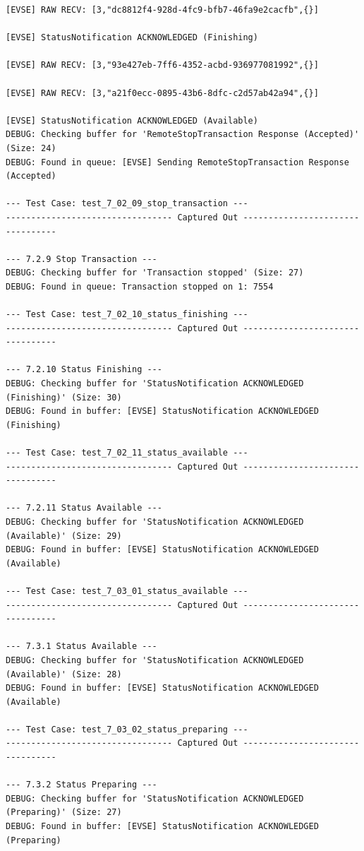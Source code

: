 \documentclass{article}
\begin{document}
\begin{lstlisting}
[EVSE] RAW RECV: [3,"dc8812f4-928d-4fc9-bfb7-46fa9e2cacfb",{}]

[EVSE] StatusNotification ACKNOWLEDGED (Finishing)

[EVSE] RAW RECV: [3,"93e427eb-7ff6-4352-acbd-936977081992",{}]

[EVSE] RAW RECV: [3,"a21f0ecc-0895-43b6-8dfc-c2d57ab42a94",{}]

[EVSE] StatusNotification ACKNOWLEDGED (Available)
DEBUG: Checking buffer for 'RemoteStopTransaction Response (Accepted)' (Size: 24)
DEBUG: Found in queue: [EVSE] Sending RemoteStopTransaction Response (Accepted)

--- Test Case: test_7_02_09_stop_transaction ---
--------------------------------- Captured Out ---------------------------------

--- 7.2.9 Stop Transaction ---
DEBUG: Checking buffer for 'Transaction stopped' (Size: 27)
DEBUG: Found in queue: Transaction stopped on 1: 7554

--- Test Case: test_7_02_10_status_finishing ---
--------------------------------- Captured Out ---------------------------------

--- 7.2.10 Status Finishing ---
DEBUG: Checking buffer for 'StatusNotification ACKNOWLEDGED (Finishing)' (Size: 30)
DEBUG: Found in buffer: [EVSE] StatusNotification ACKNOWLEDGED (Finishing)

--- Test Case: test_7_02_11_status_available ---
--------------------------------- Captured Out ---------------------------------

--- 7.2.11 Status Available ---
DEBUG: Checking buffer for 'StatusNotification ACKNOWLEDGED (Available)' (Size: 29)
DEBUG: Found in buffer: [EVSE] StatusNotification ACKNOWLEDGED (Available)

--- Test Case: test_7_03_01_status_available ---
--------------------------------- Captured Out ---------------------------------

--- 7.3.1 Status Available ---
DEBUG: Checking buffer for 'StatusNotification ACKNOWLEDGED (Available)' (Size: 28)
DEBUG: Found in buffer: [EVSE] StatusNotification ACKNOWLEDGED (Available)

--- Test Case: test_7_03_02_status_preparing ---
--------------------------------- Captured Out ---------------------------------

--- 7.3.2 Status Preparing ---
DEBUG: Checking buffer for 'StatusNotification ACKNOWLEDGED (Preparing)' (Size: 27)
DEBUG: Found in buffer: [EVSE] StatusNotification ACKNOWLEDGED (Preparing)


\end{lstlisting}
\end{document}
